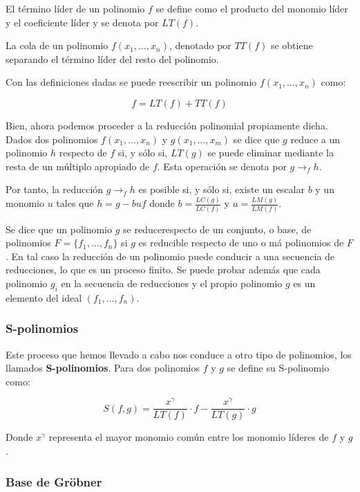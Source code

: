 \begin{definition}
El término líder de un polinomio $f$ se define como el producto del monomio líder y el coeficiente líder y se denota por $LT(f)$.
\end{definition}

\begin{definition}
La cola de un polinomio $f(x_1, \dotso, x_n)$, denotado por $TT(f)$ se obtiene separando el término líder del resto del polinomio.
\end{definition}

Con las definiciones dadas se puede reescribir un polinomio $f(x_1, \dotso, x_n)$ como:

$$f = LT(f) + TT(f)$$

Bien, ahora podemos proceder a la reducción polinomial propiamente dicha. Dados dos polinomios $f(x_1, \dotso, x_n)$ y $g(x_1, \dotso, x_m)$ se dice que $g$ reduce a un polinomio $h$ respecto de $f$ si, y sólo si, $LT(g)$ se puede eliminar mediante la resta de un múltiplo apropiado de $f$. Esta operación se denota por $g \to_f h$.
\par
Por tanto, la reducción $g \to_f h$ es posible si, y sólo si, existe un escalar $b$ y un monomio $u$ tales que $h = g - buf$ donde $b = \frac{LC(g)}{LC(f)}$ y $u =\frac{LM(g)}{LM(f)}$.
\par
Se dice que un polinomio $g$ se reducerespecto de un conjunto, o base, de polinomios $F = \{ f_1, \dotso, f_n \}$ si $g$ es reducible respecto de uno o má polinomios de $F$. En tal caso la reducción de un polinomio puede conducir a una secuencia de reducciones, lo que es un proceso finito. Se puede probar además que cada polinomio $g_i$ en la secuencia de reducciones y el propio polinomio $g$ es un elemento del ideal $(f_1, \dotso, f_n)$.

\subsubsection*{S-polinomios}

Este proceso que hemos llevado a cabo nos conduce a otro tipo de polinomios, los llamados \textbf{S-polinomios}. Para dos polinomios $f$ y $g$ se define su S-polinomio como:

$$S(f,g) = \frac{x^{\gamma}}{LT(f)} \cdot f - \frac{x^{\gamma}}{LT(g)} \cdot g$$

Donde $x^{\gamma}$ representa el mayor monomio común entre los monomio líderes de $f$ y $g$.

\subsubsection*{Base de Gröbner}

